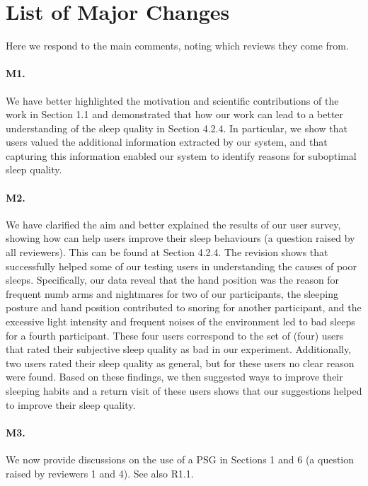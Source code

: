 \section*{List of Major Changes}

Here we respond to the main comments, noting which reviews they come from.

\paragraph{M1.} We have better highlighted the motivation and scientific contributions of the work in Section 1.1 and demonstrated that how our work can lead to
a better understanding of the sleep quality in Section 4.2.4. In particular, we show that users valued the additional information extracted by our system, and that capturing this information enabled our system to identify reasons for suboptimal sleep quality. 

\paragraph{M2.} We have clarified the aim and better explained the results of our user survey, showing how \systemname can help users
improve their sleep behaviours (a question raised by all reviewers). This can be found at Section 4.2.4. The revision shows that
\systemname successfully helped some of our testing users in understanding the causes of poor sleeps. Specifically, our data reveal that
the hand position was the reason for frequent numb arms and nightmares for two of our participants, the sleeping posture and hand position
contributed to snoring for another participant, and the excessive light intensity and frequent noises of the environment led to bad sleeps
for a fourth participant. These four users correspond to the set of (four) users that rated their subjective sleep quality as bad in our experiment. Additionally, two users rated their sleep quality as general, but for these users no clear reason were found. Based on these findings, we then suggested ways to improve their sleeping habits and a return visit of these
users shows that our suggestions helped to improve their sleep quality. 

\paragraph{M3.} We now provide discussions on the use of a PSG in Sections 1 and 6 (a question raised by reviewers 1 and 4). See also R1.1.

